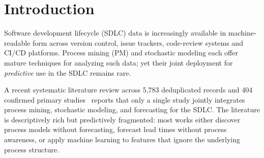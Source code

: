 
\section{Introduction}
\label{sec:introduction}

Software development lifecycle (SDLC) data is increasingly available in
machine-readable form across version control, issue trackers, code-review
systems and CI/CD platforms. Process mining (PM) and stochastic modeling
each offer mature techniques for analyzing such data; yet their joint
deployment for \emph{predictive} use in the SDLC remains rare.

A recent systematic literature review across 5{,}783 deduplicated records
and 404 confirmed primary studies~\cite{almeida2026slr} reports that
only a single study jointly integrates process mining, stochastic
modeling, and forecasting for the SDLC. The literature is descriptively
rich but predictively fragmented: most works either discover process
models without forecasting, forecast lead times without process awareness,
or apply machine learning to features that ignore the underlying process
structure.


